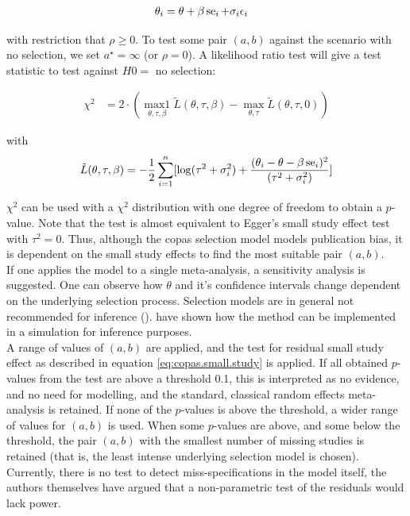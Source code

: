 \documentclass[11pt,a4paper,twoside]{book}\usepackage[]{graphicx}\usepackage[]{color}
\begin{document}
\begin{align}
\theta_i &= \theta + \beta \operatorname{se}_i + \sigma_i \epsilon_i \nonumber
\end{align}

with restriction that $\rho \geq 0$. To test some pair $(a,b)$ against the scenario with no selection, we set $a^\star = \infty$ (or $\rho = 0$). A likelihood ratio test will give a test statistic to test against $H0 =$ no selection:

\begin{align}
\chi^2 &= 2\cdot(\operatorname*{max1}_{\theta, \tau, \beta}\tilde{L}(\theta, \tau, \beta) - \operatorname*{max}_{\theta, \tau}\tilde{L}(\theta, \tau, 0)) \label{eq:copas.small.study}
\end{align}

with 
\begin{align}
\tilde{L}(\theta, \tau, \beta) = -\frac{1}{2}\sum_{i = 1}^n[\log(\tau^2 + \sigma_i^2) + \frac{(\theta_i - \theta - \beta \operatorname{se}_i)^2}{(\tau^2 + \sigma_i^2)}] \nonumber
\end{align}

$\chi^2$ can be used with a $\chi^2$ distribution with one degree of freedom to obtain a $p$-value. Note that the test is almost equivalent to Egger's small study effect test with $\tau^2 = 0$. Thus, although the copas selection model models publication bias, it is dependent on the small study effects to find the most suitable pair $(a,b)$. \\
If one applies the model to a single meta-analysis, a sensitivity analysis is suggested. One can observe how $\theta$ and it's confidence intervals change dependent on the underlying selection process. Selection models are in general not recommended for inference (\eg \citet{selection.assessment}). 
\citet{limitmeta} have shown how the method can be implemented in a simulation for inference purposes. \\
A range of values of $(a,b)$ are applied, and the test for residual small study effect as described in equation \ref{eq:copas.small.study} is applied. If all obtained $p$-values from the test are above a threshold 0.1, this is interpreted as no evidence, and no need for modelling, and the standard, classical random effects meta-analysis is retained. If none of the $p$-values is above the threshold, a wider range of values for $(a,b)$ is used. When some $p$-values are above, and some below the threshold, the pair $(a,b)$ with the smallest number of missing studies is retained (that is, the least intense underlying selection model is chosen).\\
Currently, there is no test to detect miss-specifications in the model itself, the authors themselves have argued that a non-parametric test of the residuals would lack power.
\end{document}
